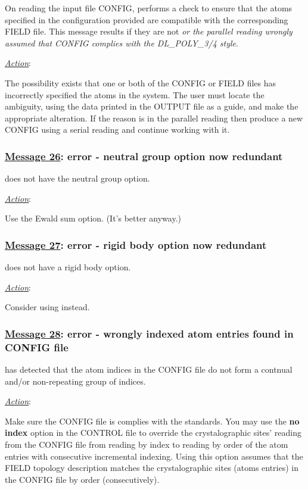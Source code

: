 On reading the input file CONFIG, \D performs a check to ensure
that the atoms specified in the configuration provided are
compatible with the corresponding FIELD file.  This message
results if they are not {\em or the parallel reading wrongly
assumed that CONFIG complies with the DL\_POLY\_3/4 style}.

\noindent \underline{\em Action}:

The possibility exists that one or both of the CONFIG or FIELD
files has incorrectly specified the atoms in the system.  The user
must locate the ambiguity, using the data printed in the OUTPUT
file as a guide, and make the appropriate alteration.  If the
reason is in the parallel reading then produce a new CONFIG
using a serial reading and continue working with it.

\subsubsection*{\underline{Message 26}: error - neutral group option now redundant}

\D does not have the neutral group option.

\noindent \underline{\em Action}:

Use the Ewald sum option.  (It's better anyway.)

\subsubsection*{\underline{Message 27}: error - rigid body option now redundant}

\D does not have a rigid body option.

\noindent \underline{\em Action}:

Consider using \C instead.

\subsubsection*{\underline{Message 28}: error - wrongly indexed atom entries found in CONFIG file}

\D has detected that the atom indices in the CONFIG file do not
form a contnual and/or non-repeating group of indices.

\noindent \underline{\em Action}:

Make sure the CONFIG file is complies with the \D standards.
You may use the {\bf no index} option in the CONTROL file to
override the crystalographic sites' reading from the CONFIG file
from reading by index to reading by order of the atom entries
with consecutive incremental indexing.  Using this option assumes
that the FIELD topology description matches the crystalographic
sites (atoms entries) in the CONFIG file by order (consecutively).

